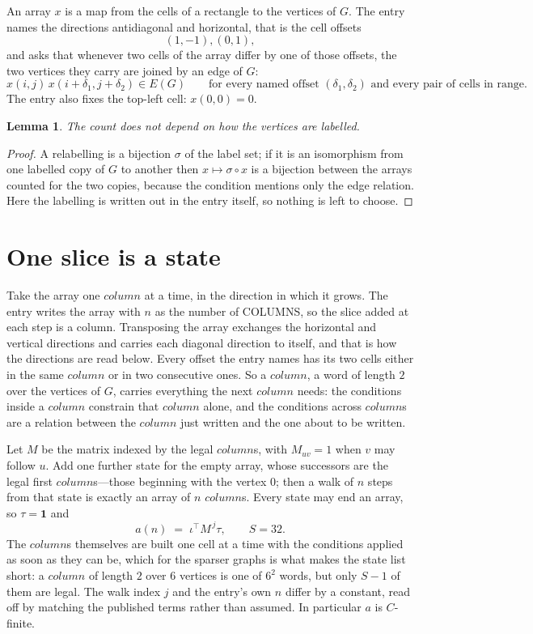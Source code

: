 \documentclass[11pt,a4paper]{article}
\theoremstyle{plain}
\newtheorem{lemma}[theorem]{Lemma}
\theoremstyle{definition}
\begin{document}
An array $x$ is a map from the cells of a rectangle to the vertices of $G$. The entry names the
directions antidiagonal and horizontal, that is the cell offsets
\[
(1,-1), (0,1),
\]
and asks that whenever two cells of the array differ by one of those offsets, the two vertices
they carry are joined by an edge of $G$:
\[
x(i,j)\,x(i+\delta_1,j+\delta_2)\in E(G)\qquad
\text{for every named offset } (\delta_1,\delta_2)\text{ and every pair of cells in range.}
\]
The entry also fixes the top-left cell: $x(0,0)=0$.

\begin{lemma}\label{lem:label}
The count does not depend on how the vertices are labelled.
\end{lemma}

\begin{proof}
A relabelling is a bijection $\sigma$ of the label set; if it is an isomorphism from one
labelled copy of $G$ to another then $x\mapsto\sigma\circ x$ is a bijection between the arrays
counted for the two copies, because the condition mentions only the edge relation.
Here the labelling is written out in the entry itself, so nothing is left to choose.
\end{proof}

\section{One slice is a state}

Take the array one $column$ at a time, in the direction in which it grows. The entry writes the array with $n$ as the number of COLUMNS, so the slice added at each step is a column. Transposing the array exchanges the horizontal and vertical directions and carries each diagonal direction to itself, and that is how the directions are read below.
Every offset the entry names has its two cells either in the same $column$ or in two
consecutive ones. So a $column$, a word of length $2$ over the vertices of $G$, carries
everything the next $column$ needs: the conditions inside a $column$ constrain that
$column$ alone, and the conditions across $column$s are a relation between the
$column$ just written and the one about to be written.

Let $M$ be the matrix indexed by the legal $column$s, with $M_{uv}=1$ when $v$ may
follow $u$. Add one further state for the empty array, whose successors are the legal first
$column$s---those beginning with the vertex $0$; then a walk of
$n$ steps from that state is exactly an array of $n$ $column$s. Every state may end an
array, so $\tau=\mathbf{1}$ and
\[
a(n)\;=\;\iota^{\!\top}M^{\,j}\tau ,\qquad S=32.
\]
The $column$s themselves are built one cell at a time with the conditions applied as soon
as they can be, which for the sparser graphs is what makes the state list short: a $column$
of length $2$ over $6$ vertices is one of $6^{2}$ words, but only $S-1$ of them are
legal. The walk index $j$ and the entry's own $n$ differ by a constant, read off by matching the
published terms rather than assumed. In particular $a$ is $C$-finite.
\end{document}

